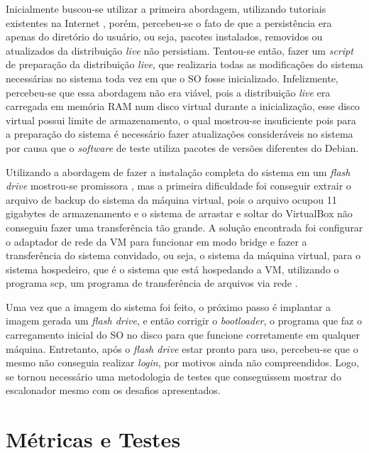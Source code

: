 Inicialmente buscou-se utilizar a primeira abordagem, utilizando tutoriais existentes na Internet \cite{PersistantDebianLive} \cite{PersistantDebianLive2}, porém, percebeu-se o fato de que a persistência era apenas do diretório do usuário, ou seja, pacotes instalados, removidos ou atualizados da distribuição \textit{live} não persistiam. Tentou-se então, fazer um \textit{script} de preparação da distribuição \textit{live}, que realizaria todas as modificações do sistema necessárias no sistema toda vez em que o \acrfull{SO} fosse inicializado. Infelizmente, percebeu-se que essa abordagem não era viável, pois a distribuição \textit{live} era carregada em memória  \acrshort{RAM} num disco virtual durante a inicialização, esse disco virtual possui limite de armazenamento, o qual mostrou-se insuficiente pois para a preparação do sistema é necessário fazer atualizações consideráveis no sistema por causa que o \textit{software} de teste utiliza pacotes de versões diferentes do Debian.

Utilizando a abordagem de fazer a instalação completa do sistema em um \textit{flash drive} mostrou-se promissora \cite{DuplicarSistema}, mas a primeira dificuldade foi conseguir extrair o arquivo de backup do sistema da máquina virtual, pois o arquivo ocupou 11 gigabytes de armazenamento e o sistema de arrastar e soltar do VirtualBox não conseguiu fazer uma transferência tão grande. A solução encontrada foi configurar o adaptador de rede da \acrshort{VM} para funcionar em modo bridge \cite{NetworkVirtualBox} e fazer a transferência do sistema convidado, ou seja, o sistema da máquina virtual, para o sistema hospedeiro, que é o sistema que está hospedando a \acrshort{VM}, utilizando o programa scp, um programa de transferência de arquivos via rede \cite{LinuxSCP}.

Uma vez que a imagem do sistema foi feito, o próximo passo é implantar a imagem gerada um \textit{flash drive}, e então corrigir o \textit{bootloader}, o programa que faz o carregamento inicial do \acrshort{SO} no disco para que funcione corretamente em qualquer máquina. Entretanto, após o \textit{flash drive} estar pronto para uso, percebeu-se que o mesmo não conseguia realizar \textit{login}, por motivos ainda não compreendidos. Logo, se tornou necessário uma metodologia de testes que conseguissem mostrar do escalonador mesmo com os desafios apresentados.

\section{Métricas e Testes}


